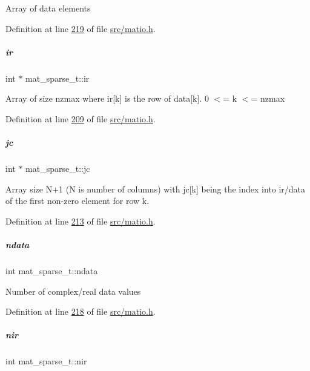 Array of data elements 

Definition at line \hyperlink{src_2matio_8h_source_l00219}{219} of file \hyperlink{src_2matio_8h_source}{src/matio.\+h}.

\mbox{\label{group___m_a_t_a8d4c863d704edddec5cbfa15b2d719c8}} 
\subparagraph{\texorpdfstring{ir}{ir}}
{\footnotesize\ttfamily int $\ast$ mat\+\_\+sparse\+\_\+t\+::ir}

Array of size nzmax where ir\mbox{[}k\mbox{]} is the row of data\mbox{[}k\mbox{]}. 0 $<$= k $<$= nzmax 

Definition at line \hyperlink{src_2matio_8h_source_l00209}{209} of file \hyperlink{src_2matio_8h_source}{src/matio.\+h}.

\mbox{\label{group___m_a_t_ad1e74cdc4f7eff1e47a670297c01da4b}} 
\subparagraph{\texorpdfstring{jc}{jc}}
{\footnotesize\ttfamily int $\ast$ mat\+\_\+sparse\+\_\+t\+::jc}

Array size N+1 (N is number of columns) with jc\mbox{[}k\mbox{]} being the index into ir/data of the first non-\/zero element for row k. 

Definition at line \hyperlink{src_2matio_8h_source_l00213}{213} of file \hyperlink{src_2matio_8h_source}{src/matio.\+h}.

\mbox{\label{group___m_a_t_a1beb8a8c58a808207cbea650563a9b63}} 
\subparagraph{\texorpdfstring{ndata}{ndata}}
{\footnotesize\ttfamily int mat\+\_\+sparse\+\_\+t\+::ndata}

Number of complex/real data values 

Definition at line \hyperlink{src_2matio_8h_source_l00218}{218} of file \hyperlink{src_2matio_8h_source}{src/matio.\+h}.

\mbox{\label{group___m_a_t_aa64636ad57cf87f7a28ff5018437a850}} 
\subparagraph{\texorpdfstring{nir}{nir}}
{\footnotesize\ttfamily int mat\+\_\+sparse\+\_\+t\+::nir}

